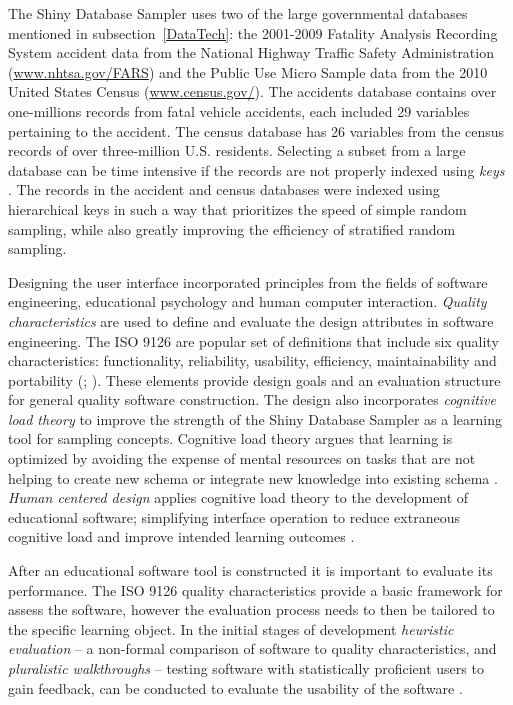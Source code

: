 \documentclass[11pt]{isuthesis}\usepackage[]{graphicx}\usepackage[]{color}
\begin{document}
The Shiny Database Sampler uses two of the large governmental databases mentioned in subsection~\ref{DataTech}: the 2001-2009 Fatality Analysis Recording System accident data from the National Highway Traffic Safety Administration (\url{www.nhtsa.gov/FARS}) and the Public Use Micro Sample data from the 2010 United States Census (\url{www.census.gov/}). The accidents database contains over one-millions records from fatal vehicle accidents, each included 29 variables pertaining to the accident. The census database has 26 variables from the census records of over three-million U.S. residents. Selecting a subset from a large database can be time intensive if the records are not properly indexed using \textit{keys} \citep{Schwartz}. The records in the accident and census databases were indexed using hierarchical keys in such a way that prioritizes the speed of simple random sampling, while also greatly improving the efficiency of stratified random sampling. 

Designing the user interface incorporated principles from the fields of software engineering, educational psychology and human computer interaction. \textit{Quality characteristics} are used to define and evaluate the design attributes in software engineering. The ISO 9126 are popular set of definitions that include six quality characteristics: functionality, reliability, usability, efficiency, maintainability and portability (\citealt{bevan1997quality}; \citealt{manuel2002quality}). These elements provide design goals and an evaluation structure for general quality software construction. The design also incorporates \textit{cognitive load theory} to improve the strength of the Shiny Database Sampler as a learning tool for sampling concepts. Cognitive load theory argues that learning is optimized by avoiding the expense of mental resources on tasks that are not helping to create new schema or integrate new knowledge into existing schema \citep{muller2008}. \textit{Human centered design} applies cognitive load theory to the development of educational software; simplifying interface operation to reduce extraneous cognitive load and improve intended learning outcomes \citep{oviatt2006}. 

After an educational software tool is constructed it is important to evaluate its performance. The ISO 9126 quality characteristics provide a basic framework for assess the software, however the evaluation process needs to then be tailored to the specific learning object. In the initial stages of development \textit{heuristic evaluation} -- a non-formal comparison of software to quality characteristics, and \textit{pluralistic walkthroughs} -- testing software with statistically proficient users to gain feedback, can be conducted to evaluate the usability of the software \citep{nielsen1994}. 
\end{document}
